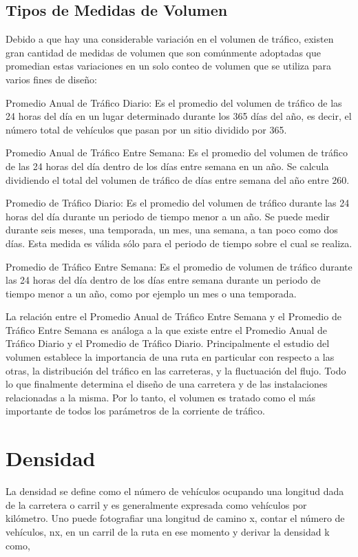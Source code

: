 \subsection{Tipos de Medidas de Volumen}

Debido a que hay una considerable variación en el volumen de tráfico, existen gran cantidad de medidas de volumen que son comúnmente adoptadas que promedian estas variaciones en un solo conteo de volumen que se utiliza para varios fines de diseño:

Promedio Anual de Tráfico Diario: Es el promedio del volumen de tráfico de las 24 horas del día en un lugar determinado durante los 365 días del año, es decir, el número total de vehículos que pasan por un sitio dividido por 365.

Promedio Anual de Tráfico Entre Semana: Es el promedio del volumen de tráfico de las 24 horas del día dentro de los días entre semana en un año. Se calcula dividiendo el total del volumen de tráfico de días entre semana del año entre 260.

Promedio de Tráfico Diario: Es el promedio del volumen de tráfico durante las 24 horas del día durante un periodo de tiempo menor a un año. Se puede medir durante seis meses, una temporada, un mes, una semana, a tan poco como dos días. Esta medida es válida sólo para el periodo de tiempo sobre el cual se realiza.

Promedio de Tráfico Entre Semana: Es el promedio de volumen de tráfico durante las 24 horas del día dentro de los días entre semana durante un periodo de tiempo menor a un año, como por ejemplo un mes o una temporada.

La relación entre el Promedio Anual de Tráfico Entre Semana y el Promedio de Tráfico Entre Semana es análoga a la que existe entre el Promedio Anual de Tráfico Diario y el Promedio de Tráfico Diario. Principalmente el estudio del volumen establece la importancia de una ruta en particular con respecto a las otras, la distribución del tráfico en las carreteras, y la fluctuación del flujo. Todo lo que finalmente determina el diseño de una carretera y de las instalaciones relacionadas a la misma. Por lo tanto, el volumen es tratado como el más importante de todos los parámetros de la corriente de tráfico.

\section{Densidad}

La densidad se define como el número de vehículos ocupando una longitud dada de la carretera o carril y es generalmente expresada como vehículos por kilómetro. Uno puede fotografiar una longitud de camino x, contar el número de vehículos, nx, en un carril de la ruta en ese momento y derivar la densidad k como,

